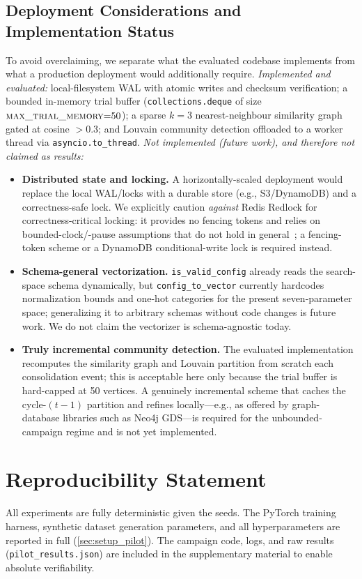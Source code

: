 \documentclass[conference]{IEEEtran}
\begin{document}
\subsection{Deployment Considerations and Implementation Status}
To avoid overclaiming, we separate what the evaluated codebase implements from what a production deployment would additionally require. \emph{Implemented and evaluated:} local-filesystem WAL with atomic writes and checksum verification; a bounded in-memory trial buffer (\texttt{collections.deque} of size $\textsc{max\_trial\_memory}{=}50$); a sparse $k{=}3$ nearest-neighbour similarity graph gated at cosine $>0.3$; and Louvain community detection offloaded to a worker thread via \texttt{asyncio.to\_thread}. \emph{Not implemented (future work), and therefore not claimed as results:}
\begin{itemize}[leftmargin=1.5em,itemsep=1pt]
  \item \textbf{Distributed state and locking.} A horizontally-scaled deployment would replace the local WAL/locks with a durable store (e.g., S3/DynamoDB) and a correctness-safe lock. We explicitly caution \emph{against} Redis Redlock for correctness-critical locking: it provides no fencing tokens and relies on bounded-clock/-pause assumptions that do not hold in general~\citep{kleppmann2016locking}; a fencing-token scheme or a DynamoDB conditional-write lock is required instead.
  \item \textbf{Schema-general vectorization.} \texttt{is\_valid\_config} already reads the search-space schema dynamically, but \texttt{config\_to\_vector} currently hardcodes normalization bounds and one-hot categories for the present seven-parameter space; generalizing it to arbitrary schemas without code changes is future work. We do not claim the vectorizer is schema-agnostic today.
  \item \textbf{Truly incremental community detection.} The evaluated implementation recomputes the similarity graph and Louvain partition from scratch each consolidation event; this is acceptable here only because the trial buffer is hard-capped at 50 vertices. A genuinely incremental scheme that caches the cycle-$(t{-}1)$ partition and refines locally---e.g., as offered by graph-database libraries such as Neo4j GDS---is required for the unbounded-campaign regime and is not yet implemented.
\end{itemize}

\section*{Reproducibility Statement}
All experiments are fully deterministic given the seeds. The PyTorch training harness, synthetic dataset generation parameters, and all hyperparameters are reported in full (\cref{sec:setup_pilot}). The campaign code, logs, and raw results (\texttt{pilot\_results.json}) are included in the supplementary material to enable absolute verifiability.
\end{document}
